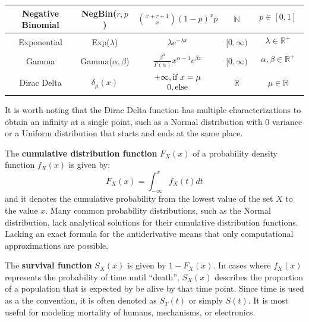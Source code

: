 \documentclass[10pt, a5paper, twoside, openright]{memoir}
\begin{document}
\begin{center}
{\begin{tabular}{|c | c | c | c | c|}
	\hline
	Negative Binomial & NegBin($r,p$) & ${{x+r+1}\choose{x}}(1-p)^x p$ & $\mathbb N$ & $ \begin{matrix} p\in[0,1] \\ \ \end{matrix}$\\
	\hline
	Exponential & Exp($\lambda$) & $\lambda e^{- \lambda x}$ & $[0,\infty)$ & $\begin{matrix} \lambda \in \mathbb R^+ \\ \ \end{matrix}$\\
	\hline
	Gamma & Gamma($\alpha, \beta$) & $\frac{\beta ^ \alpha}{\Gamma ( \alpha)} x^{\alpha - 1} e^{\beta x}$ & $[0, \infty)$ & $\begin{matrix} \alpha , \beta \in \mathbb R^+ \\ \ \end{matrix}$\\
	\hline
	Dirac Delta & $\delta_\mu(x)$ & $\begin{matrix} +\infty, \textnormal{if} \ x=\mu \\ 0, \textnormal{else} \end{matrix}$ & $\mathbb R$ & $\mu \in \mathbb R$\\
	\hline
\end{tabular}}
\end{center}
\noindent
It is worth noting that the Dirac Delta function has multiple characterizations to obtain an infinity at a single point, such as a Normal distribution with $0$ variance or a Uniform distribution that starts and ends at the same place.

The \textbf{cumulative distribution function} $F_X(x)$ of a probability density function $f_X(x)$ is given by:
$$F_X(x) = \int_{-\infty}^x f_X(t)dt$$ 
and it denotes the cumulative probability from the lowest value of the set $X$ to the value $x$. Many common probability distributions, such as the Normal distribution, lack analytical solutions for their cumulative distribution functions. Lacking an exact formula for the antiderivative means that only computational approximations are possible.

The \textbf{survival function} $S_X(x)$ is given by $1-F_X(x)$. In cases where $f_X(x)$ represents the probability of time until ``death'', $S_X(x)$ describes the proportion of a population that is expected by be alive by that time point. Since time is used as a the convention, it is often denoted as $S_T(t)$ or simply $S(t)$. It is most useful for modeling mortality of humans, mechanisms, or electronics.
\end{document}
